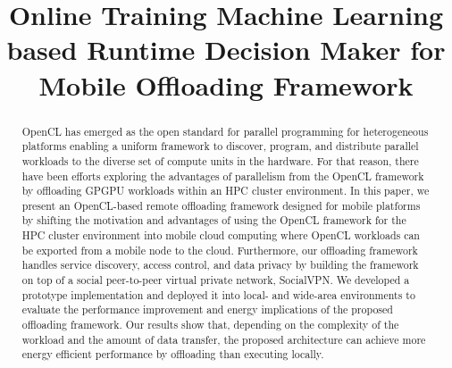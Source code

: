 \documentclass[10pt, conference, compsocconf]{IEEEtran}
\begin{document}


\title{Online Training Machine Learning based Runtime Decision Maker for
Mobile Offloading Framework}

\author{
\and
{}
}

\maketitle

\begin{abstract}
%
OpenCL has emerged as the open standard for parallel programming for
heterogeneous platforms enabling a uniform framework to discover,
program, and distribute parallel workloads to the diverse set of compute
units in the hardware.
%
For that reason, there have been efforts exploring the advantages of
parallelism from the OpenCL framework by offloading GPGPU workloads
within an HPC cluster environment.
%
In this paper, we present an OpenCL-based remote offloading framework
designed for mobile platforms by shifting the motivation and
advantages of using the OpenCL framework for the HPC cluster environment
into mobile cloud computing where OpenCL workloads can be exported from
a mobile node to the cloud.
%
Furthermore, our offloading framework handles service discovery, access
control, and data privacy by building the framework on top of a social
peer-to-peer virtual private network, SocialVPN. 
%
We developed a prototype implementation and deployed it into local- and
wide-area environments to evaluate the performance improvement and
energy implications of the proposed offloading framework.
%
Our results show that, depending on the complexity of the workload and
the amount of data transfer, the proposed architecture can achieve more
energy efficient performance by offloading than executing locally.
\end{abstract}
\end{document}
